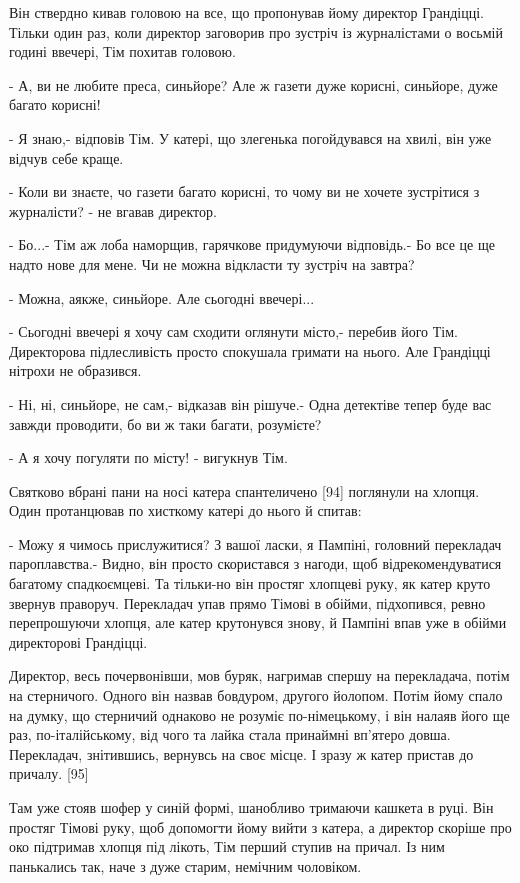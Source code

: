 Він ствердно кивав головою на все, що пропонував йому директор Грандіцці. Тільки один раз, коли директор заговорив про зустріч із журналістами о восьмій годині ввечері, Тім похитав головою.

- А, ви не любите преса, синьйоре? Але ж газети дуже корисні, синьйоре, дуже багато корисні!

- Я знаю,- відповів Тім. У катері, що злегенька погойдувався на хвилі, він уже відчув себе краще.

- Коли ви знаєте, чо газети багато корисні, то чому ви не хочете зустрітися з журналісти? - не вгавав директор.

- Бо...- Тім аж лоба наморщив, гарячкове придумуючи відповідь.- Бо все це ще надто нове для мене. Чи не можна відкласти ту зустріч на завтра?

- Можна, аякже, синьйоре. Але сьогодні ввечері...

- Сьогодні ввечері я хочу сам сходити оглянути місто,- перебив його Тім. Директорова підлесливість просто спокушала гримати на нього. Але Грандіцці нітрохи не образився.

- Ні, ні, синьйоре, не сам,- відказав він рішуче.- Одна детектіве тепер буде вас завжди проводити, бо ви ж таки багати, розумієте?

- А я хочу погуляти по місту! - вигукнув Тім.

Святково вбрані пани на носі катера спантеличено [94] поглянули на хлопця. Один протанцював по хисткому катері до нього й спитав:

- Можу я чимось прислужитися? З вашої ласки, я Пампіні, головний перекладач пароплавства.- Видно, він просто скористався з нагоди, щоб відрекомендуватися багатому спадкоємцеві. Та тільки-но він простяг хлопцеві руку, як катер круто звернув праворуч. Перекладач упав прямо Тімові в обійми, підхопився, ревно перепрошуючи хлопця, але катер крутонувся знову, й Пампіні впав уже в обійми директорові Грандіцці.

Директор, весь почервонівши, мов буряк, нагримав спершу на перекладача, потім на стерничого. Одного він назвав бовдуром, другого йолопом. Потім йому спало на думку, що стерничий однаково не розуміє по-німецькому, і він налаяв його ще раз, по-італійському, від чого та лайка стала принаймні вп'ятеро довша. Перекладач, знітившись, вернувсь на своє місце. І зразу ж катер пристав до причалу. [95]

Там уже стояв шофер у синій формі, шанобливо тримаючи кашкета в руці. Він простяг Тімові руку, щоб допомогти йому вийти з катера, а директор скоріше про око підтримав хлопця під лікоть, Тім перший ступив на причал. Із ним панькались так, наче з дуже старим, немічним чоловіком.

